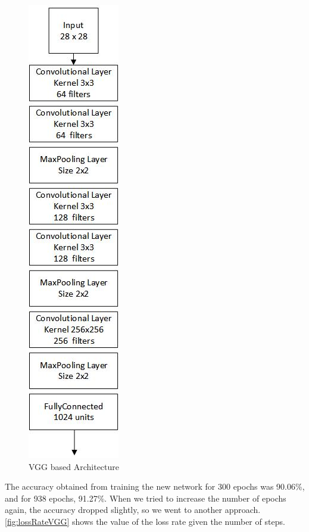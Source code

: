 \documentclass{article}
\begin{document}
    \begin{figure}[h]
    \begin{center}
        \includegraphics[scale=0.65]{vggArch.jpg}
        \caption{VGG based Architecture\label{fig:vgg}}
    \end{center}
    \end{figure}
    
    The accuracy obtained from training the new network for 300 epochs was 90.06\%, and for 938 epochs, 91.27\%. When we tried to increase the number of epochs again, the accuracy dropped slightly, so we went to another approach. \ref{fig:lossRateVGG} shows the value of the loss rate given the number of steps.
    
\end{document}
